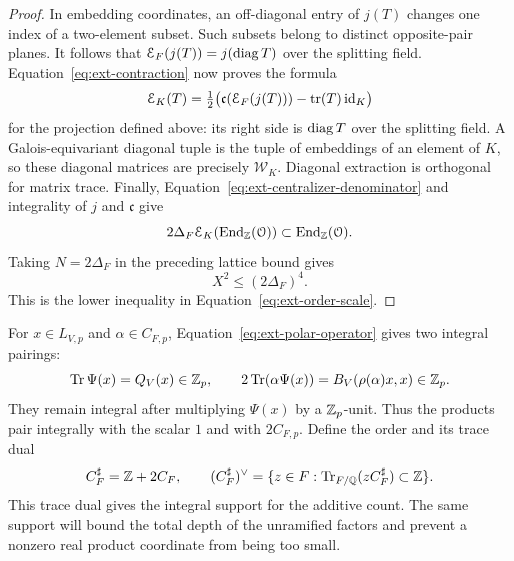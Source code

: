 \begin{proof}
In embedding coordinates, an off-diagonal entry of \(j(T)\) changes
one index of a two-element subset.  Such subsets belong to distinct
opposite-pair planes.  It follows that
\(\mathcal E_F(j(T))=j(\operatorname{diag} T)\) over the splitting field.
Equation~\eqref{eq:ext-contraction} now proves the formula
\begin{equation}
 \mathcal E_K(T)=
 \tfrac12\bigl(\mathfrak c(\mathcal E_F(j(T)))-\operatorname{tr}(T)\operatorname{id}_K\bigr)
 \label{eq:ext-multiplication-projection}
\end{equation}
for the projection defined above: its right side is \(\operatorname{diag} T\)
over the splitting field.  A Galois-equivariant diagonal tuple is
the tuple of embeddings of an element of \(K\), so these diagonal
matrices are precisely \(\mathscr W_K\).  Diagonal extraction is
orthogonal for matrix trace.  Finally,
Equation~\eqref{eq:ext-centralizer-denominator} and integrality of
\(j\) and \(\mathfrak c\) give
\[
 2\Delta_F\mathcal E_K(\operatorname{End}_\mathbb Z(\mathcal O))\subset\operatorname{End}_\mathbb Z(\mathcal O).
\]
Taking \(N=2\Delta_F\) in the preceding lattice bound gives
\[
 X^2\le(2\Delta_F)^4.
\]
This is the lower inequality in Equation~\eqref{eq:ext-order-scale}.
\end{proof}

For \(x\in L_{V,p}\) and \(\alpha\in C_{F,p}\),
Equation~\eqref{eq:ext-polar-operator} gives two integral pairings:
\[
 \operatorname{Tr}\Psi(x)=Q_V(x)\in\mathbb Z_p,\qquad
 2\operatorname{Tr}(\alpha\Psi(x))=B_V(\rho(\alpha)x,x)\in\mathbb Z_p.
\]
They remain integral after multiplying \(\Psi(x)\) by a \(\mathbb Z_p\)-unit.
Thus the products pair integrally with the scalar \(1\) and with
\(2C_{F,p}\).  Define the order and its trace dual
\[
 C_F^\sharp=\mathbb Z+2C_F,\qquad
 (C_F^\sharp)^\vee
   =\{z\in F:\operatorname{Tr}_{F/\mathbb Q}(zC_F^\sharp)\subset\mathbb Z\}.
\]
This trace dual gives the integral support for the additive count.
The same support will bound the total depth of the unramified factors
and prevent a nonzero real product coordinate from being too small.


